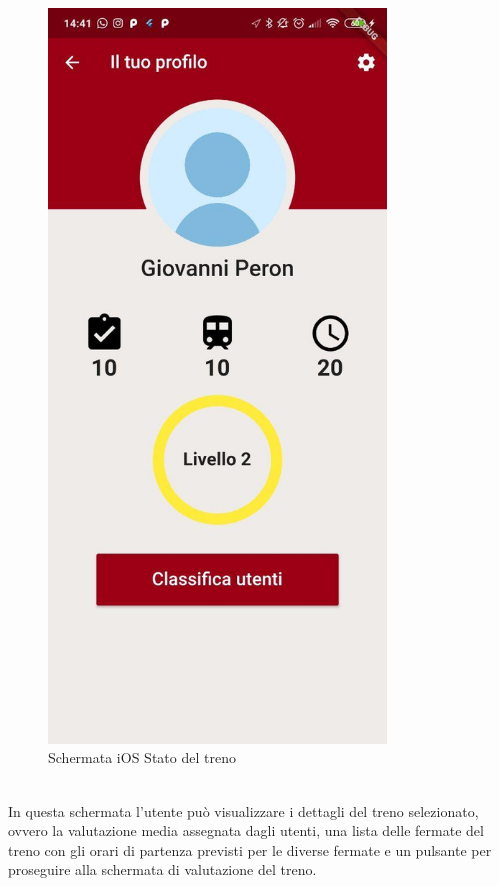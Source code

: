\hfill
\begin{minipage}{0.45\textwidth}
	\begin{figure}[H]
		\centering
		\includegraphics[width=0.8\textwidth]{immagini/profile.jpg}
		\caption{Schermata iOS Stato del treno}
	\end{figure}
\end{minipage}
\vspace{1cm}
\\
In questa schermata l'utente può visualizzare i dettagli del treno selezionato, ovvero la valutazione media assegnata dagli utenti, una lista delle fermate del treno con gli orari di partenza previsti per le diverse fermate e un pulsante per proseguire alla schermata di valutazione del treno.

